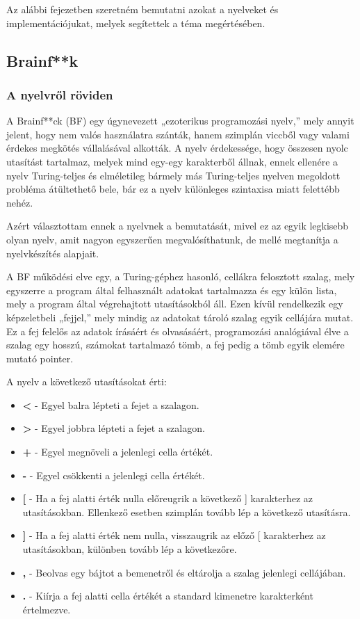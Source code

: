 Az alábbi fejezetben szeretném bemutatni azokat a nyelveket és implementációjukat, melyek segítettek a téma megértésében.

\subsection{Brainf**k}

\subsubsection{A nyelvről röviden}

A Brainf**ck (BF) egy úgynevezett „ezoterikus programozási nyelv,” mely annyit jelent, hogy nem valós használatra szánták, hanem szimplán viccből vagy valami érdekes megkötés vállalásával alkották. A nyelv érdekessége, hogy összesen nyolc utasítást tartalmaz, melyek mind egy-egy karakterből állnak, ennek ellenére a nyelv Turing-teljes és elméletileg bármely más Turing-teljes nyelven megoldott probléma átültethető bele, bár ez a nyelv különleges szintaxisa miatt felettébb nehéz.

Azért választottam ennek a nyelvnek a bemutatását, mivel ez az egyik legkisebb olyan nyelv, amit nagyon egyszerűen megvalósíthatunk, de mellé megtanítja a nyelvkészítés alapjait.

A BF működési elve egy, a Turing-géphez hasonló, cellákra felosztott szalag, mely egyszerre a program által felhasznált adatokat tartalmazza és egy külön lista, mely a program által végrehajtott utasításokból áll. Ezen kívül rendelkezik egy képzeletbeli „fejjel,” mely mindig az adatokat tároló szalag egyik cellájára mutat. Ez a fej felelős az adatok írásáért és olvasásáért, programozási analógiával élve a szalag egy hosszú, számokat tartalmazó tömb, a fej pedig a tömb egyik elemére mutató pointer.

A nyelv a következő utasításokat érti:

\begin{itemize}
    \item \textbf{<} - Egyel balra lépteti a fejet a szalagon.
    \item \textbf{>} - Egyel jobbra lépteti a fejet a szalagon.
    \item \textbf{+} - Egyel megnöveli a jelenlegi cella értékét.
    \item \textbf{-} - Egyel csökkenti a jelenlegi cella értékét.
    \item \textbf{[} - Ha a fej alatti érték nulla előreugrik a következő ] karakterhez az utasításokban. Ellenkező esetben szimplán tovább lép a következő utasításra. 
    \item \textbf{]} - Ha a fej alatti érték nem nulla, visszaugrik az előző [ karakterhez az utasításokban, különben tovább lép a következőre.
    \item \textbf{,} - Beolvas egy bájtot a bemenetről és eltárolja a szalag jelenlegi cellájában.
    \item \textbf{.} - Kiírja a fej alatti cella értékét a standard kimenetre karakterként értelmezve.
\end{itemize}

